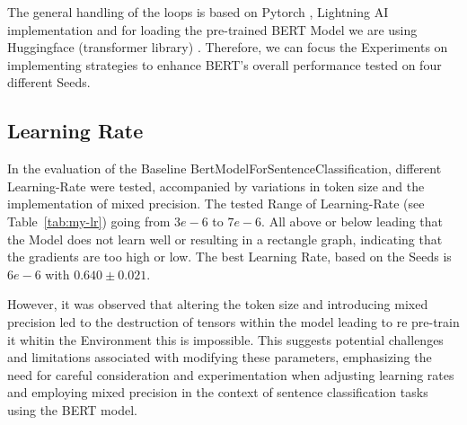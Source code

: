 \vspace{0.3cm}

The general handling of the loops is based on Pytorch \cite{noauthor_pytorch_nodate}, Lightning AI \cite{noauthor_lightning_nodate}
implementation and for loading the pre-trained BERT Model we are using Huggingface (transformer library) \cite{noauthor_hugging_2023}.
Therefore, we can focus the Experiments on implementing strategies to enhance BERT's overall performance tested on four different Seeds.











\subsection{Learning Rate}

In the evaluation of the Baseline BertModelForSentenceClassification, different Learning-Rate 
were tested, accompanied by variations in token size and the implementation of mixed precision.
The tested Range of Learning-Rate (see Table~\ref{tab:my-lr}) going from $3e-6$ to $7e-6$. All above or
below leading that the Model does not learn well or resulting in a rectangle graph, indicating
that the gradients are too high or low. The best Learning Rate, based on the Seeds is $6e-6$ with
$0.640 \pm 0.021$.

However, it was observed that altering the token size and introducing mixed precision led to 
the destruction of tensors within the model leading to re pre-train it whitin the Environment
this is impossible. 
This suggests potential challenges and limitations associated with modifying these parameters, 
emphasizing the need for careful consideration and experimentation when adjusting 
learning rates and employing mixed precision in the context of sentence classification 
tasks using the BERT model.

